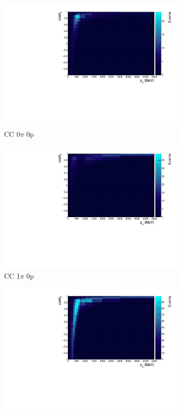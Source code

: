 \begin{figure}
\centering
\begin{subfigure}{.49\textwidth}
  \centering
  \includegraphics[width=0.9\linewidth]{figs/hptpc_pmtmuu_cc0pi0p.pdf}
  \caption{CC 0$\pi$ 0p}
\end{subfigure}
\begin{subfigure}{.49\textwidth}
  \centering
  \includegraphics[width=0.9\linewidth]{figs/hptpc_pmtmuu_cc1pi0p.pdf}
  \caption{CC 1$\pi$ 0p}
\end{subfigure}
\begin{subfigure}{.49\textwidth}
  \centering
  \includegraphics[width=0.9\linewidth]{figs/hptpc_pmtmuu_cc0pi1p.pdf}

\end{subfigure}
\end{figure}
